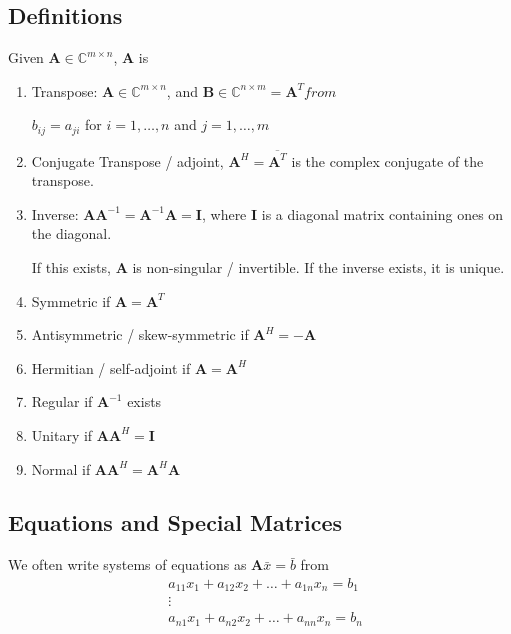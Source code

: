 \documentclass[12pt]{article}
\newcommand{\ve}[1]{\ensuremath{\mathbf{#1}}}
\begin{document}
\subsection{Definitions}

Given $\ve{A} \in \mathbb{C}^{m \times n}$, \ve{A} is
%
\begin{enumerate}
\item Transpose: $\ve{A} \in \mathbb{C}^{m \times n}$, and $\ve{B} \in \mathbb{C}^{n \times m} = \ve{A}^T from$

$b_{	ij} = a_{ji}$ for $i = 1, \dots, n$ and $j = 1, \dots, m$

\item Conjugate Transpose / adjoint, $\ve{A}^H = \overline{\ve{A}^T}$ is the complex conjugate of the transpose. 

\item Inverse: $\ve{AA}^{-1} = \ve{A}^{-1}\ve{A} = \ve{I}$, where $\ve{I}$ is a diagonal matrix containing ones on the diagonal.

If this exists, $\ve{A}$ is non-singular / invertible. If the inverse exists, it is unique.

\item Symmetric if $\ve{A} = \ve{A}^T$

\item Antisymmetric / skew-symmetric if $\ve{A}^H = -\ve{A}$

\item Hermitian / self-adjoint if $\ve{A} = \ve{A}^H$

\item Regular if $\ve{A}^{-1}$ exists

\item Unitary if $\ve{A}\ve{A}^H = \ve{I}$

\item Normal if $\ve{A}\ve{A}^H = \ve{A}^H\ve{A}$
\end{enumerate}


\subsection{Equations and Special Matrices}

We often write systems of equations as $\ve{A}\bar{x} = \bar{b}$ from
\begin{align}
&a_{11} x_1 + a_{12} x_2 + \dots + a_{1n} x_n = b_1 \nonumber \\
&\vdots \nonumber \\
&a_{n1} x_1 + a_{n2} x_2 + \dots + a_{nn} x_n = b_n \nonumber
\end{align}
\end{document}
